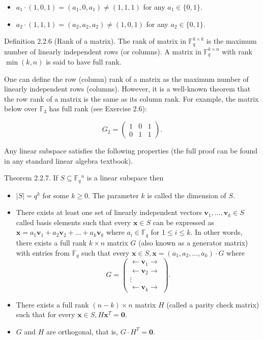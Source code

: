 \documentclass[10pt]{article}
\begin{document}
\begin{itemize}
  \item[-] $a_{1} \cdot(1,0,1)=\left(a_{1}, 0, a_{1}\right) \neq(1,1,1)$ for any $a_{1} \in\{0,1\}$.
  \item[-] $a_{2} \cdot(1,1,1)=\left(a_{2}, a_{2}, a_{2}\right) \neq(1,0,1)$ for any $a_{2} \in\{0,1\}$.
\end{itemize}

Definition 2.2.6 (Rank of a matrix). The rank of matrix in $\mathbb{F}_{q}^{k \times k}$ is the maximum number of linearly independent rows (or columns). A matrix in $\mathbb{F}_{q}^{k \times n}$ with rank $\min (k, n)$ is said to have full rank.

One can define the row (column) rank of a matrix as the maximum number of linearly independent rows (columns). However, it is a well-known theorem that the row rank of a matrix is the same as its column rank. For example, the matrix below over $\mathbb{F}_{3}$ has full rank (see Exercise 2.6):


\begin{equation*}
G_{2}=\left(\begin{array}{lll}
1 & 0 & 1 \\
0 & 1 & 1
\end{array}\right) . \tag{2.3}
\end{equation*}


Any linear subspace satisfies the following properties (the full proof can be found in any standard linear algebra textbook).

Theorem 2.2.7. If $S \subseteq \mathbb{F}_{q}{ }^{n}$ is a linear subspace then

\begin{itemize}
  \item[1.] $|S|=q^{k}$ for some $k \geq 0$. The parameter $k$ is called the dimension of $S$.
  \item[2.] There exists at least one set of linearly independent vectors $\mathbf{v}_{1}, \ldots, \mathbf{v}_{k} \in S$ called basis elements such that every $\mathbf{x} \in S$ can be expressed as $\mathbf{x}=a_{1} \mathbf{v}_{1}+a_{2} \mathbf{v}_{2}+\ldots+a_{k} \mathbf{v}_{k}$ where $a_{i} \in \mathbb{F}_{q}$ for $1 \leq i \leq k$. In other words, there exists a full rank $k \times n$ matrix $G$ (also known as a generator matrix) with entries from $\mathbb{F}_{q}$ such that every $\mathbf{x} \in S, \mathbf{x}=\left(a_{1}, a_{2}, \ldots, a_{k}\right) \cdot G$ where
$$
G=\left(\begin{array}{c}
\longleftarrow \mathbf{v}_{1} \longrightarrow \\
\longleftarrow \mathbf{v}_{2} \longrightarrow \\
\vdots \\
\longleftarrow \mathbf{v}_{k} \longrightarrow
\end{array}\right) .
$$
  \item[3.] There exists a full rank $(n-k) \times n$ matrix $H$ (called a parity check matrix) such that for every $\mathbf{x} \in S, H \mathbf{x}^{T}=\mathbf{0}$.
  \item[4.] $G$ and $H$ are orthogonal, that is, $G \cdot H^{T}=\mathbf{0}$.
\end{itemize}
\end{document}
